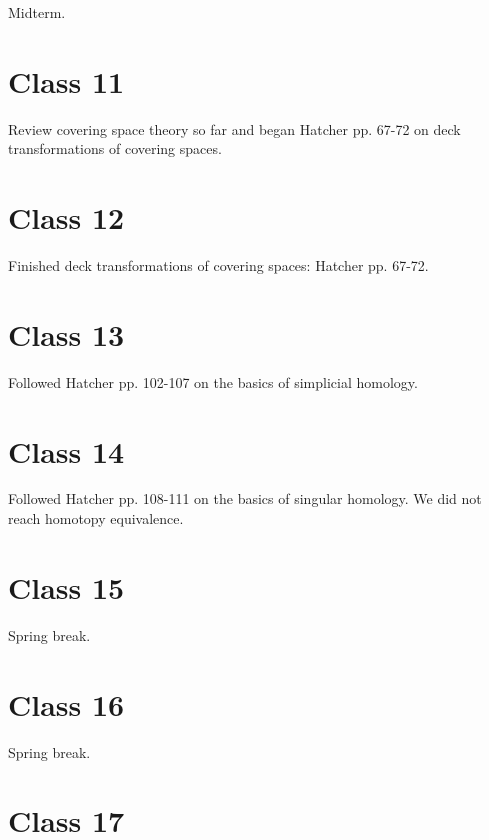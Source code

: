 \documentclass{../mathnotes}
\begin{document}
Midterm.

\section*{Class 11}

Review covering space theory so far and began Hatcher pp. 67-72 on deck transformations of covering spaces.

\section*{Class 12}

Finished deck transformations of covering spaces: Hatcher pp. 67-72.

\section*{Class 13}

Followed Hatcher pp. 102-107 on the basics of simplicial homology.

\section*{Class 14}

Followed Hatcher pp. 108-111 on the basics of singular homology. We did not reach
homotopy equivalence.

\section*{Class 15}

Spring break.

\section*{Class 16}

Spring break.

\section*{Class 17}
\end{document}
